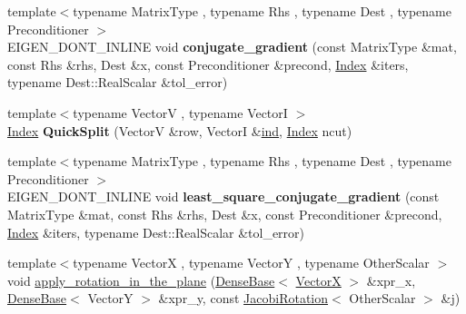 \begin{DoxyCompactItemize}
\item 
\mbox{\label{namespace_eigen_1_1internal_aff9eaa3ce0bcecb14e4664d80c44d801}} 
{\footnotesize template$<$typename Matrix\+Type , typename Rhs , typename Dest , typename Preconditioner $>$ }\\E\+I\+G\+E\+N\+\_\+\+D\+O\+N\+T\+\_\+\+I\+N\+L\+I\+NE void {\bfseries conjugate\+\_\+gradient} (const Matrix\+Type \&mat, const Rhs \&rhs, Dest \&x, const Preconditioner \&precond, \hyperlink{namespace_eigen_a62e77e0933482dafde8fe197d9a2cfde}{Index} \&iters, typename Dest\+::\+Real\+Scalar \&tol\+\_\+error)
\item 
\mbox{\label{namespace_eigen_1_1internal_a78664f5a9fe806690984dc3a31738a6b}} 
{\footnotesize template$<$typename VectorV , typename VectorI $>$ }\\\hyperlink{namespace_eigen_a62e77e0933482dafde8fe197d9a2cfde}{Index} {\bfseries Quick\+Split} (VectorV \&row, VectorI \&\hyperlink{structind}{ind}, \hyperlink{namespace_eigen_a62e77e0933482dafde8fe197d9a2cfde}{Index} ncut)
\item 
\mbox{\label{namespace_eigen_1_1internal_a634d8729318abe89f12e5520951c5131}} 
{\footnotesize template$<$typename Matrix\+Type , typename Rhs , typename Dest , typename Preconditioner $>$ }\\E\+I\+G\+E\+N\+\_\+\+D\+O\+N\+T\+\_\+\+I\+N\+L\+I\+NE void {\bfseries least\+\_\+square\+\_\+conjugate\+\_\+gradient} (const Matrix\+Type \&mat, const Rhs \&rhs, Dest \&x, const Preconditioner \&precond, \hyperlink{namespace_eigen_a62e77e0933482dafde8fe197d9a2cfde}{Index} \&iters, typename Dest\+::\+Real\+Scalar \&tol\+\_\+error)
\item 
{\footnotesize template$<$typename VectorX , typename VectorY , typename Other\+Scalar $>$ }\\void \hyperlink{namespace_eigen_1_1internal_a5f7738a5c56c9b9decf94d9728ba7906}{apply\+\_\+rotation\+\_\+in\+\_\+the\+\_\+plane} (\hyperlink{group___core___module_class_eigen_1_1_dense_base}{Dense\+Base}$<$ \hyperlink{group___core___module}{VectorX} $>$ \&xpr\+\_\+x, \hyperlink{group___core___module_class_eigen_1_1_dense_base}{Dense\+Base}$<$ VectorY $>$ \&xpr\+\_\+y, const \hyperlink{group___jacobi___module_class_eigen_1_1_jacobi_rotation}{Jacobi\+Rotation}$<$ Other\+Scalar $>$ \&j)
\item 
\mbox{\label{namespace_eigen_1_1internal_a181974fd132805d09b70eb561a4a858f}} 

\end{DoxyCompactItemize}
